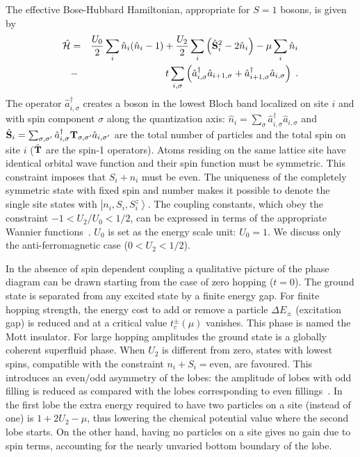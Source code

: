 \documentclass[prl,twocolumn,superscriptaddress,showpacs,floatfix]{revtex4}
\newcommand{\barr}{\begin{eqnarray}}
\newcommand{\earr}{\end{eqnarray}}
\newcommand{\vett}[1]{{\bf #1}}
\newcommand{\ket}[1]{\left\vert#1\right\rangle}
\newcommand{\Ham}{\mathcal H}
\newcommand{\op}[1]{\hat{#1}}
\begin{document}
The effective Bose-Hubbard Hamiltonian, appropriate for $S=1$ bosons, is
given by
\barr 
   \op{\Ham} & = & \frac{U_{0}}{2} \sum_i \op{n}_i (\op{n}_i - 1) + 
   \frac{U_{2}}{2} \sum_i \left(\op{\vett{S}}^2_i - 2 \op{n}_i \right)
   - \mu \sum_i \op{n}_i \nonumber \\
   & - & t \sum_{i,\sigma} \left( 
   \op{a}^{\dag}_{i, \sigma} \op{a}_{i+1, \sigma} + 
   \op{a}^{\dag}_{i+1, \sigma} \op{a}_{i, \sigma}
   \right) \;.
\label{eq:BHM}
\earr
The operator $\op{a}^{\dag}_{i, \sigma}$ creates a boson in the lowest Bloch
band localized on site $i$ and with spin component $\sigma$
along the quantization axis:
$
  \op{n}_i = \sum_{\sigma} \op{a}^{\dag}_{i, \sigma} \op{a}_{i, \sigma}
$ and 
$
  \op{\vett{S}}_i = 
  \sum_{\sigma,\sigma'} \op{a}^{\dag}_{i, \sigma}
  \vett{T}_{\sigma,\sigma'} \op{a}_{i, \sigma'}
$
are the total number of particles and the total spin on site $i$
($\op{\vett{T}}$ are the spin-1 operators). Atoms residing on the same lattice 
site have identical orbital wave function and their spin function must be 
symmetric. This constraint imposes that $S_{i} + n_{i}$ must be even. 
The uniqueness of the completely symmetric state with fixed spin and number 
makes it possible to denote the single site states with
$\ket{n_i, S_i, S^z_i}$. The coupling constants, which obey the constraint
$-1 < U_2/U_0 < 1/2$,
can be expressed in terms of the appropriate Wannier 
functions~\cite{imambekov03}.
$U_0$ is set as the energy scale unit: $U_0=1$.
We discuss only the anti-ferromagnetic case ($0<U_{2}<1/2$).

In the absence of spin dependent coupling a qualitative picture of the phase
diagram can be drawn starting from the case of zero hopping ($t=0$).
The ground state is separated from any excited state by a finite energy gap. 
For finite hopping strength, the energy cost to add or remove
a particle $\Delta E_\pm$ (excitation gap) is reduced and at a critical
value $t_c^\pm (\mu)$ vanishes.
This phase is named the Mott insulator.
For large hopping amplitudes the ground state is a globally coherent
superfluid phase.
When $U_2$ is different from zero, states with lowest 
spins, compatible with the constraint $n_i+S_i=\mbox{even}$, are favoured. 
This introduces an even/odd asymmetry of the lobes: the amplitude of 
lobes with odd filling is reduced as compared with the lobes corresponding
to even fillings~\cite{demler02}.
In the first lobe the extra energy required to have two particles
on a site (instead of one) is $1 +2 U_2- \mu$, thus lowering the
chemical potential value where the second lobe starts.
On the other hand, having no particles on a site gives no gain due to
spin terms, accounting for the nearly unvaried bottom boundary of the lobe.
\end{document}
